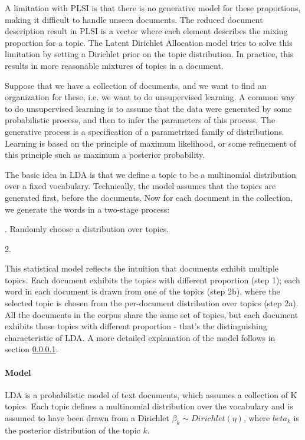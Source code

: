 \documentclass[12pt]{report}
\begin{document}
A limitation with PLSI is that there is no generative model for these
proportions, making it difficult to handle unseen documents. The reduced
document description result in PLSI is a vector where each element describes the
mixing proportion for a topic. The Latent Dirichlet Allocation model tries to
solve this limitation by setting a Dirichlet prior on the topic
distribution\cite{blei2003latent}. In practice, this results in more reasonable
mixtures of topics in a document.
 
Suppose that we have a collection of documents, and we want to find an
organization for these, i.e. we want to do unsupervised learning. A common way
to do unsupervised learning is to assume that the data were generated by some
probabilistic process, and then to infer the parameters of this process. The
generative process is a specification of a parametrized family of
distributions. Learning is based on the principle of maximum likelihood, or
some refinement of this principle such as maximum a posterior probability.
 
The basic idea in LDA is that we define a topic to be a multinomial
distribution over a fixed vocabulary. Technically, the model assumes 
that the topics are generated first, before the
documents\cite{Blei11introductionto}. Now for each document in the
collection, we generate the words in a two-stage process:

\begin{algorithm}[H]
. Randomly choose a distribution over topics.

2. 
\end{algorithm}

This statistical model reflects the intuition that documents exhibit
multiple topics. Each document exhibits the topics with different
proportion (step 1); each word in each document is drawn from one of
the topics (step 2b), where the selected topic is chosen from the
per-document distribution over topics (step 2a). All the documents in
the corpus share the same set of topics, but each document exhibits
those topics with different proportion - that's the distinguishing
characteristic of LDA. A more detailed explanation of the model
follows in section \ref{LDAmodel}.

\paragraph{Model}
\label{LDAmodel}
LDA is a probabilistic model of text documents, which assumes a
collection of K topics. Each topic defines a multinomial distribution
over the vocabulary and is assumed to have been drawn from a Dirichlet
$\beta_k \sim Dirichlet(\eta)$, where $beta_k$ is the posterior 
distribution of the topic $k$.
\end{document}
